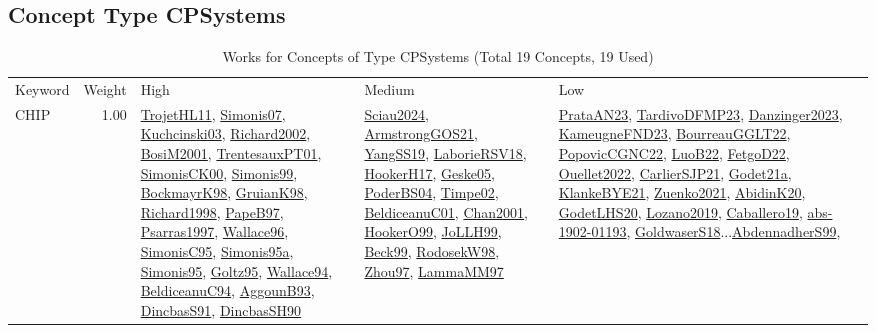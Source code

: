 \subsection{Concept Type CPSystems}
\label{sec:CPSystems}
\label{CPSystems}
{\scriptsize
\begin{longtable}{p{3cm}r>{\raggedright\arraybackslash}p{6cm}>{\raggedright\arraybackslash}p{6cm}>{\raggedright\arraybackslash}p{8cm}}
\rowcolor{white}\caption{Works for Concepts of Type CPSystems (Total 19 Concepts, 19 Used)}\\ \toprule
\rowcolor{white}Keyword & Weight & High & Medium & Low\\ \midrule\endhead
\bottomrule
\endfoot
\index{CHIP}\index{CPSystems!CHIP}CHIP &  1.00 & \hyperref[detail:TrojetHL11]{TrojetHL11}, \hyperref[detail:Simonis07]{Simonis07}, \hyperref[detail:Kuchcinski03]{Kuchcinski03}, \hyperref[detail:Richard2002]{Richard2002}, \hyperref[detail:BosiM2001]{BosiM2001}, \hyperref[detail:TrentesauxPT01]{TrentesauxPT01}, \hyperref[detail:SimonisCK00]{SimonisCK00}, \hyperref[detail:Simonis99]{Simonis99}, \hyperref[detail:BockmayrK98]{BockmayrK98}, \hyperref[detail:GruianK98]{GruianK98}, \hyperref[detail:Richard1998]{Richard1998}, \hyperref[detail:PapeB97]{PapeB97}, \hyperref[detail:Psarras1997]{Psarras1997}, \hyperref[detail:Wallace96]{Wallace96}, \hyperref[detail:SimonisC95]{SimonisC95}, \hyperref[detail:Simonis95a]{Simonis95a}, \hyperref[detail:Simonis95]{Simonis95}, \hyperref[detail:Goltz95]{Goltz95}, \hyperref[detail:Wallace94]{Wallace94}, \hyperref[detail:BeldiceanuC94]{BeldiceanuC94}, \hyperref[detail:AggounB93]{AggounB93}, \hyperref[detail:DincbasS91]{DincbasS91}, \hyperref[detail:DincbasSH90]{DincbasSH90} & \hyperref[detail:Sciau2024]{Sciau2024}, \hyperref[detail:ArmstrongGOS21]{ArmstrongGOS21}, \hyperref[detail:YangSS19]{YangSS19}, \hyperref[detail:LaborieRSV18]{LaborieRSV18}, \hyperref[detail:HookerH17]{HookerH17}, \hyperref[detail:Geske05]{Geske05}, \hyperref[detail:PoderBS04]{PoderBS04}, \hyperref[detail:Timpe02]{Timpe02}, \hyperref[detail:BeldiceanuC01]{BeldiceanuC01}, \hyperref[detail:Chan2001]{Chan2001}, \hyperref[detail:HookerO99]{HookerO99}, \hyperref[detail:JoLLH99]{JoLLH99}, \hyperref[detail:Beck99]{Beck99}, \hyperref[detail:RodosekW98]{RodosekW98}, \hyperref[detail:Zhou97]{Zhou97}, \hyperref[detail:LammaMM97]{LammaMM97} & \hyperref[detail:PrataAN23]{PrataAN23}, \hyperref[detail:TardivoDFMP23]{TardivoDFMP23}, \hyperref[detail:Danzinger2023]{Danzinger2023}, \hyperref[detail:KameugneFND23]{KameugneFND23}, \hyperref[detail:BourreauGGLT22]{BourreauGGLT22}, \hyperref[detail:PopovicCGNC22]{PopovicCGNC22}, \hyperref[detail:LuoB22]{LuoB22}, \hyperref[detail:FetgoD22]{FetgoD22}, \hyperref[detail:Ouellet2022]{Ouellet2022}, \hyperref[detail:CarlierSJP21]{CarlierSJP21}, \hyperref[detail:Godet21a]{Godet21a}, \hyperref[detail:KlankeBYE21]{KlankeBYE21}, \hyperref[detail:Zuenko2021]{Zuenko2021}, \hyperref[detail:AbidinK20]{AbidinK20}, \hyperref[detail:GodetLHS20]{GodetLHS20}, \hyperref[detail:Lozano2019]{Lozano2019}, \hyperref[detail:Caballero19]{Caballero19}, \hyperref[detail:abs-1902-01193]{abs-1902-01193}, \hyperref[detail:GoldwaserS18]{GoldwaserS18}...\hyperref[detail:AbdennadherS99]{AbdennadherS99}, 
\end{longtable}}
